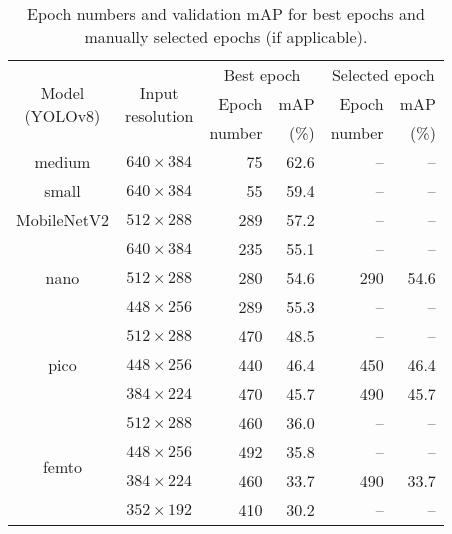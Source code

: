 \begin{table}[t]
    \centering
    \small
    \begin{threeparttable}
        \begin{tabular}{|c|c|rr|rr|}
            \hline
            \multirow{3}{*}{\parbox{1.9cm}{\centering Model\\(YOLOv8)}} &
                \multirow{3}{*}{\parbox{1.6cm}{\centering Input\\resolution}} &
                    \multicolumn{2}{c|}{Best epoch} & \multicolumn{2}{c|}{Selected epoch} \\
            \cline{3-6}
            & & Epoch  & mAP  & Epoch  & mAP \\
            & & number & (\%) & number & (\%) \\
            \hline
            \hline
            \multirow{1}{*}{medium}     & $640\times384$  &  75 & 62.6 &     -- & -- \\
            \hline                                          
            \multirow{1}{*}{small}      & $640\times384$  &  55 & 59.4 &     -- & -- \\
            \hline
            \multirow{1}{*}{MobileNetV2}& $512\times288$  & 289 & 57.2 &     -- & -- \\
            \hline                      
            \multirow{3}{*}{nano}       & $640\times384$  & 235 & 55.1 &     -- & -- \\
            \cline{2-6}
                                        & $512\times288$  & 280 & 54.6 & 290 & 54.6 \\
            \cline{2-6}
                                        & $448\times256$  & 289 & 55.3 &     -- & -- \\
            \hline
            \multirow{3}{*}{pico}       & $512\times288$  & 470 & 48.5 &     -- & -- \\
            \cline{2-6}
                                        & $448\times256$  & 440 & 46.4 & 450 & 46.4 \\
            \cline{2-6}
                                        & $384\times224$  & 470 & 45.7 & 490 & 45.7 \\
            \hline
            \multirow{4}{*}{femto}      & $512\times288$  & 460 & 36.0 &     -- & -- \\
            \cline{2-6}
                                        & $448\times256$  & 492 & 35.8 &     -- & -- \\
            \cline{2-6}
                                        & $384\times224$  & 460 & 33.7 & 490 & 33.7 \\
            \cline{2-6}
                                        & $352\times192$  & 410 & 30.2 &     -- & -- \\
            \hline
        \end{tabular}
        \caption{Epoch numbers and validation mAP for best epochs and manually
        selected epochs (if applicable).}
        \label{CheckpointsUsed}
    \end{threeparttable}
    \normalsize
\end{table}


